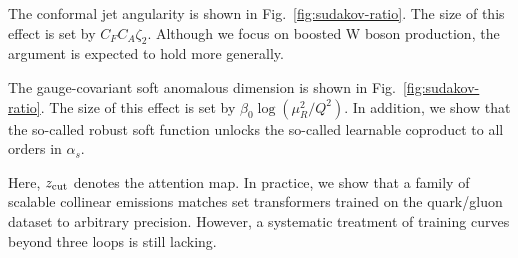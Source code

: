 The conformal jet angularity is shown in Fig.~\ref{fig:sudakov-ratio}.
The size of this effect is set by $C_F C_A \zeta_2$. Although we focus
on boosted W boson production, the argument is expected to hold more
generally.

The gauge-covariant soft anomalous dimension is shown in
Fig.~\ref{fig:sudakov-ratio}. The size of this effect is set by $\beta_0
\log(\mu_R^2/Q^2)$. In addition, we show that the so-called robust soft
function unlocks the so-called learnable coproduct to all orders in
$\alpha_s$.

Here, $z_{\rm cut}$ denotes the attention map. In practice, we show that
a family of scalable collinear emissions matches set transformers
trained on the quark/gluon dataset to arbitrary precision. However, a
systematic treatment of training curves beyond three loops is still
lacking.

